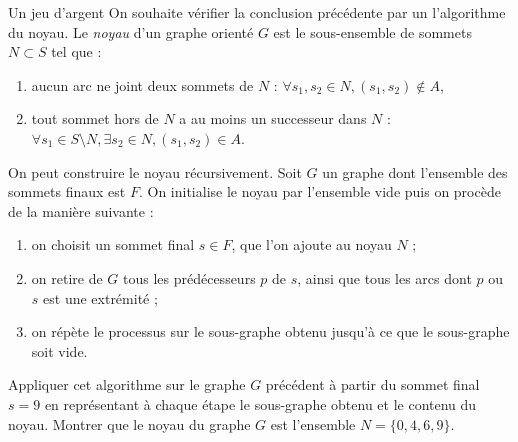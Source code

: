\begin{exo}[PC][1][devoir]{Un jeu d'argent}
   On souhaite vérifier la conclusion précédente par un l'algorithme du noyau. Le \emph{noyau} d'un graphe orienté $G$ est le sous-ensemble de sommets $N \subset S$ tel que :
  \begin{enumerate}[label=(\roman*)]
    \item aucun arc ne joint deux sommets de $N$ :  $\forall s_1,s_2 \in N, (s_1,s_2) \notin A$,
    \item tout sommet hors de $N$ a au moins un successeur dans $N$ : $\forall s_1 \in S \setminus N, \exists s_2 \in N, (s_1,s_2) \in A$. 
  \end{enumerate}
   \begin{quest}
    \item On peut construire le noyau récursivement. Soit $G$ un graphe dont l'ensemble des sommets finaux est $F$. On initialise le noyau par l'ensemble vide puis on procède de la manière suivante :
     \begin{enumerate}
      \item on choisit un sommet final $s \in F$, que l'on ajoute au noyau $N$ ;
      \item on retire de $G$ tous les prédécesseurs $p$ de $s$, ainsi que tous les arcs dont $p$ ou $s$ est une extrémité ;
      \item on répète le processus sur le sous-graphe obtenu jusqu'à ce que le sous-graphe soit vide.
    \end{enumerate}
    Appliquer cet algorithme sur le graphe $G$ précédent à partir du sommet final $s=9$ en représentant à chaque étape le sous-graphe obtenu et le contenu du noyau. Montrer que le noyau du graphe $G$ est l'ensemble $N = \{0,4,6,9\}$.


\end{quest}
\end{exo}

